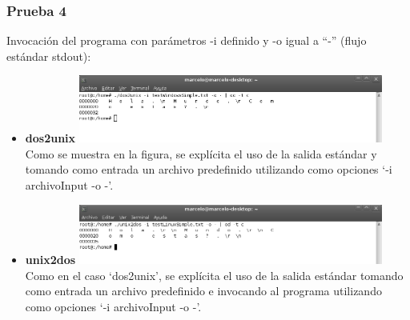\documentclass[a4paper,10pt]{article}
\begin{document}
    \subsubsection{Prueba 4}
    Invocaci\'on del programa con par\'ametros -i definido y -o igual a ``-'' (flujo est\'andar stdout):
      \begin{itemize}
      \item \textbf{dos2unix}
      \newline
      \includegraphics[width=10cm, viewport=0 0 897 199]{../Informe/Imagenes/prueba4-invocacion-dos2unix.png}
      \newline	
      Como se muestra en la figura, se expl\'icita el uso de la salida est\'andar y tomando como entrada un archivo predefinido utilizando como opciones 
      `-i archivoInput -o -'.
      \item \textbf{unix2dos}
      \newline
      \includegraphics[width=10cm, viewport=0 0 898 177]{../Informe/Imagenes/prueba4-invocacion-unix2dos.png}	
      \newline
      Como en el caso `dos2unix', se expl\'icita el uso de la salida est\'andar tomando como entrada un archivo predefinido e invocando al programa
      utilizando como opciones `-i archivoInput -o -'.
      
      \end{itemize}
\end{document}
